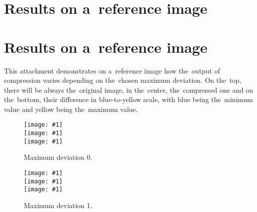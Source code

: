 \appendix

%
%
%
%
%

\openright

\chapter{Results on a~reference image}
\label{att:cd}


\chapter{Results on a~reference image}
\label{att:res_ref}

This attachment demonstrates on a~reference image how the~output of compression varies depending on the~chosen maximum deviation. On the~top, there will be always the~original image, in the~center, the~compressed one and on the~bottom, their difference in blue-to-yellow scale, with blue being the~minimum value and yellow being the~maximum value.

\newcommand{\incref}[1]{\texttt{[image: \#1]}}

\begin{figure}
	\begin{center}
		\incref{figures/out_0.png} \\ 
		\incref{figures/out_0.png} \\ 
		\incref{figures/out_diff_0.png} \\ 
	\end{center}
	\caption{Maximum deviation 0.}
\end{figure}

\begin{figure}
	\begin{center}
		\incref{figures/out_1.png} \\ 
		\incref{figures/out_1.png} \\ 
		\incref{figures/out_diff_1.png} \\ 
	\end{center}
	\caption{Maximum deviation 1.}
\end{figure}


